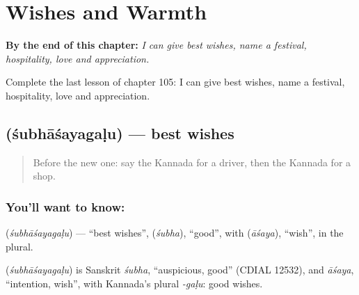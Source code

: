 
\chapter{Wishes and Warmth}
\label{ch:ka-wishes-and-warmth}

\begin{chapteropening}
\textbf{By the end of this chapter:} \emph{I can give best wishes, name a festival, hospitality, love and appreciation.}

Complete the last lesson of chapter 105: I can give best wishes, name a festival, hospitality, love and appreciation.
\end{chapteropening}

\section[\texorpdfstring{\kn{ಶುಭಾಶಯಗಳು} (śubhāśayagaḷu)}{ಶುಭಾಶಯಗಳು (śubhāśayagaḷu)}]{ (śubhāśayagaḷu) — best wishes}

\label{lesson:KA-C105-wishes}



\begin{quote}
Before the new one: say the Kannada for a driver, then the Kannada for a shop.
\end{quote}

\subsection*{You'll want to know: }
\textbf{} (\emph{śubhāśayagaḷu}) — \textquotedblleft{}best wishes\textquotedblright{}, \textbf{} (\emph{śubha}), \textquotedblleft{}good\textquotedblright{}, with \textbf{} (\emph{āśaya}), \textquotedblleft{}wish\textquotedblright{}, in the plural.

\begin{cousinweb}
\textbf{} (\emph{śubhāśayagaḷu}) is Sanskrit \emph{śubha}, \textquotedblleft{}auspicious, good\textquotedblright{} (CDIAL 12532), and \emph{āśaya}, \textquotedblleft{}intention, wish\textquotedblright{}, with Kannada's plural \emph{-gaḷu}: good wishes.
\end{cousinweb}

